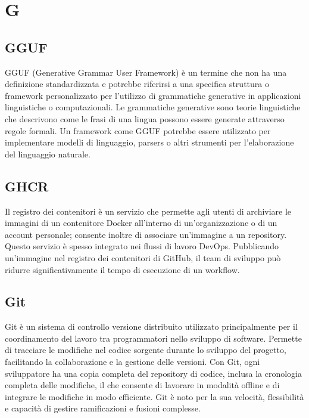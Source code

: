 \section{G}

\vspace{2em}
\subsection*{GGUF}
GGUF (Generative Grammar User Framework) è un termine che non ha una definizione standardizzata e potrebbe riferirsi a una specifica struttura o framework personalizzato per l'utilizzo di grammatiche generative in applicazioni linguistiche o computazionali. Le grammatiche generative sono teorie linguistiche che descrivono come le frasi di una lingua possono essere generate attraverso regole formali. Un framework come GGUF potrebbe essere utilizzato per implementare modelli di linguaggio, parsers o altri strumenti per l'elaborazione del linguaggio naturale.

\vspace{2em}
\subsection*{GHCR}
Il registro dei contenitori è un servizio che permette agli utenti di archiviare le immagini di un contenitore Docker all'interno di un'organizzazione o di un account personale; consente inoltre di associare un'immagine a un repository. Questo servizio è spesso integrato nei flussi di lavoro DevOps. Pubblicando un'immagine nel registro dei contenitori di GitHub, il team di sviluppo può ridurre significativamente il tempo di esecuzione di un workflow.

\vspace{2em}
\subsection*{Git}
Git è un sistema di controllo versione distribuito utilizzato principalmente per il coordinamento del lavoro tra programmatori nello sviluppo di software. Permette di tracciare le modifiche nel codice sorgente durante lo sviluppo del progetto, facilitando la collaborazione e la gestione delle versioni. Con Git, ogni sviluppatore ha una copia completa del repository di codice, inclusa la cronologia completa delle modifiche, il che consente di lavorare in modalità offline e di integrare le modifiche in modo efficiente. Git è noto per la sua velocità, flessibilità e capacità di gestire ramificazioni e fusioni complesse.

